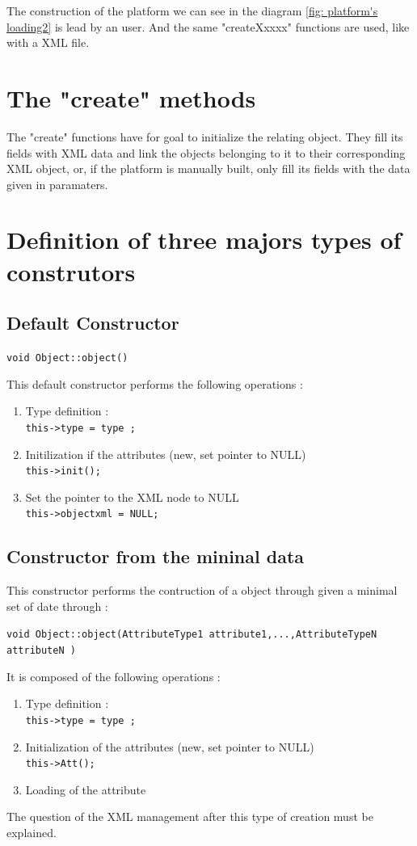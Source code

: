 The construction of the platform we can see in the diagram \ref{fig: platform's loading2} is lead by an user. And the same "createXxxxx" functions are used, like with a XML file.

\section{The "create" methods}
The "create" functions have for goal to initialize the relating object. They fill its fields with XML data and link the objects belonging to it to their corresponding XML object, or, if the platform is manually built, only fill its fields with the data given in paramaters.


\section{Definition of three majors types of construtors}

\subsection{Default Constructor}


{\tt void Object::object() }

This default constructor performs the following operations :
\begin{enumerate}
\item Type definition : \\
  {\tt this->type = type ; }
\item Initilization if the attributes (new, set pointer to NULL) \\
  {\tt this->init(); }
\item Set the pointer to the XML node to NULL \\
  {\tt this->objectxml =  NULL; }
\end{enumerate}

\subsection{Constructor from the mininal data}

This constructor performs  the contruction of a object through given a minimal set of date through :

{\tt void Object::object(AttributeType1 attribute1,...,AttributeTypeN attributeN ) }



 It is composed of the following operations :
\begin{enumerate}
\item Type definition : \\
  {\tt this->type = type ; }
\item Initialization of the attributes (new, set pointer to NULL) \\
  {\tt this->Att(); }
\item Loading of the attribute 
\end{enumerate}


The question of the XML management after this type of creation must be explained.
